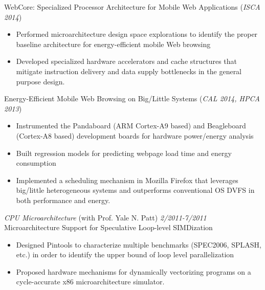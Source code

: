\documentclass[margin, 9pt]{res} %
\begin{document}
\begin{resume}
\medskip
WebCore: Specialized Processor Architecture for Mobile Web Applications \hfill(\textit{ISCA 2014})\\
\vspace*{-10pt}
\begin{itemize}[leftmargin=*] \itemsep -3pt
\vspace*{-5pt}
	\item Performed microarchitecture design space explorations to identify the proper baseline architecture for energy-efficient mobile Web browsing
	\item Developed specialized hardware accelerators and cache structures that mitigate instruction delivery and data supply bottlenecks in the general purpose design.
\end{itemize}

\medskip
Energy-Efficient Mobile Web Browsing on Big/Little Systems \hfill(\textit{CAL 2014, HPCA 2013})\\
\vspace*{-10pt}
\begin{itemize}[leftmargin=*] \itemsep -3pt
\vspace*{-5pt}
	\item Instrumented the Pandaboard (ARM Cortex-A9 based) and Beagleboard (Cortex-A8 based) development boards for hardware power/energy analysis
	\item Built regression models for predicting webpage load time and energy consumption
	\item Implemented a scheduling mechanism in Mozilla Firefox that leverages big/little heterogeneous systems and outperforms conventional OS DVFS in both performance and energy.
\end{itemize}

\medskip
{\large\textit{CPU Microarchitecture} (with Prof. Yale N. Patt)} \hfill\textit{2/2011-7/2011}\\

\vspace*{-7pt}
Microarchitecture Support for Speculative Loop-level SIMDization\\
\vspace*{-10pt}
\begin{itemize}[leftmargin=*] \itemsep -3pt
\vspace*{-5pt}
	\item Designed Pintools to characterize multiple benchmarks (SPEC2006, SPLASH, etc.) in order to identify the upper bound of loop level parallelization
	\item Proposed hardware mechanisms for dynamically vectorizing programs on a cycle-accurate x86 microarchitecture simulator.
\end{itemize}


\end{resume}
\end{document}
